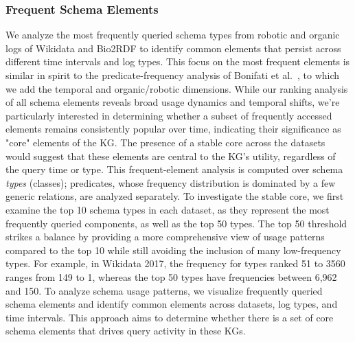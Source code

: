 \documentclass[sw]{iosart2x}
\begin{document}



\subsubsection{Frequent Schema Elements} \label{sec:s62}
We analyze the most frequently queried schema types from robotic and organic logs of Wikidata and Bio2RDF to identify common elements that persist across different time intervals and log types. This focus on the most frequent elements is similar in spirit to the predicate-frequency analysis of Bonifati et al.\ \cite{bonifati2019navigating}, to which we add the temporal and organic/robotic dimensions. While our ranking analysis of all schema elements reveals broad usage dynamics and temporal shifts, we're particularly interested in determining whether a subset of frequently accessed elements remains consistently popular over time, indicating their significance as "core" elements of the KG. The presence of a stable core across the datasets would suggest that these elements are central to the KG’s utility, regardless of the query time or type. This frequent-element analysis is computed over schema \emph{types} (classes); predicates, whose frequency distribution is dominated by a few generic relations, are analyzed separately. To investigate the stable core, we first examine the top 10 schema types in each dataset, as they represent the most frequently queried components, as well as the top 50 types. The top 50 threshold strikes a balance by providing a more comprehensive view of usage patterns compared to the top 10 while still avoiding the inclusion of many low-frequency types. For example, in Wikidata 2017, the frequency for types ranked 51 to 3560 ranges from 149 to 1, whereas the top 50 types have frequencies between 6,962 and 150. To analyze schema usage patterns, we visualize frequently queried schema elements and identify common elements across datasets, log types, and time intervals. This approach aims to determine whether there is a set of core schema elements that drives query activity in these KGs.
\end{document}
